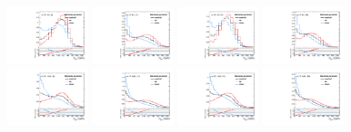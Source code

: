 \begin{figure}[htbp]
  \centering
  \includegraphics[width=0.21\textwidth]{fig/uncertainties/systs_nonRes_e_HP_bb_LDy_MJJScale_ProjY.pdf}
  \includegraphics[width=0.21\textwidth]{fig/uncertainties/systs_nonRes_e_LP_bb_LDy_MJJScale_ProjY.pdf}
  \includegraphics[width=0.21\textwidth]{fig/uncertainties/systs_nonRes_e_HP_bb_HDy_MJJScale_ProjY.pdf}
  \includegraphics[width=0.21\textwidth]{fig/uncertainties/systs_nonRes_e_LP_bb_HDy_MJJScale_ProjY.pdf}\\
  \includegraphics[width=0.21\textwidth]{fig/uncertainties/systs_nonRes_e_HP_nobb_LDy_MJJScale_ProjY.pdf}
  \includegraphics[width=0.21\textwidth]{fig/uncertainties/systs_nonRes_e_LP_nobb_LDy_MJJScale_ProjY.pdf}
  \includegraphics[width=0.21\textwidth]{fig/uncertainties/systs_nonRes_e_HP_nobb_HDy_MJJScale_ProjY.pdf}
  \includegraphics[width=0.21\textwidth]{fig/uncertainties/systs_nonRes_e_LP_nobb_HDy_MJJScale_ProjY.pdf}\\

\end{figure}
